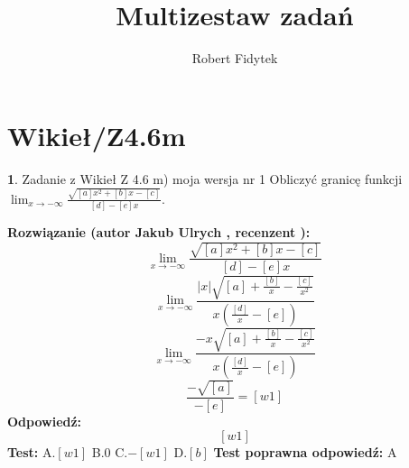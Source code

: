 \documentclass[12pt, a4paper]{article}
\title{Multizestaw zadań}
\author{Robert Fidytek}
\date{}
\theoremstyle{definition} %
\newtheorem{zad}{}
\newcommand{\kategoria}[1]{\section{#1}} %
\newcommand{\zadStart}[1]{\begin{zad}#1\newline} %
\newcommand{\zadStop}{\end{zad}}   %
\newcommand{\rozwStart}[2]{\noindent \textbf{Rozwiązanie (autor #1 , recenzent #2): }\newline} %
\newcommand{\rozwStop}{\newline}                                            %
\newcommand{\odpStart}{\noindent \textbf{Odpowiedź:}\newline}    %
\newcommand{\odpStop}{\newline}                                             %
\newcommand{\testStart}{\noindent \textbf{Test:}\newline} %
\newcommand{\testStop}{\newline} %
\newcommand{\kluczStart}{\noindent \textbf{Test poprawna odpowiedź:}\newline} %
\newcommand{\kluczStop}{\newline} %
\begin{document}
\maketitle


\kategoria{Wikieł/Z4.6m}
\zadStart{Zadanie z Wikieł Z 4.6 m) moja wersja nr 1}
Obliczyć granicę funkcji $\lim_{x \to -\infty}\frac{\sqrt{[a]x^{2}+[b]x-[c]}}{[d]-[e]x}$.
\zadStop
\rozwStart{Jakub Ulrych}{}
$$\lim_{x \to -\infty}\frac{\sqrt{[a]x^{2}+[b]x-[c]}}{[d]-[e]x}$$
$$\lim_{x \to -\infty}\frac{|x|\sqrt{[a]+\frac{[b]}{x}-\frac{[c]}{x^{2}}}}{x(\frac{[d]}{x}-[e])}$$
$$\lim_{x \to -\infty}\frac{-x\sqrt{[a]+\frac{[b]}{x}-\frac{[c]}{x^{2}}}}{x(\frac{[d]}{x}-[e])}$$
$$\frac{-\sqrt{[a]}}{-[e]}=[w1]$$
\rozwStop
\odpStart
$$[w1]$$
\odpStop
\testStart
A.$[w1]$
B.$0$
C.$-[w1]$
D.$[b]$
\testStop
\kluczStart
A
\kluczStop
\end{document}
